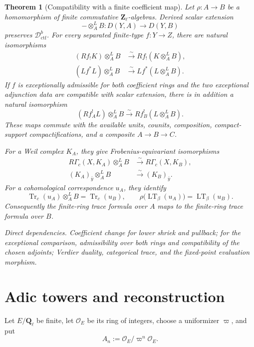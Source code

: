 \documentclass[10pt]{article}
\newtheorem{theorem}{Theorem}[section]
\theoremstyle{definition}
\newcommand{\Zl}{\mathbf Z_\ell}
\newcommand{\Ql}{\mathbf Q_\ell}
\newcommand{\OO}{\mathcal O}
\newcommand{\Dctf}{\mathcal D^b_{\mathrm{ctf}}}
\newcommand{\RGammac}{R\Gamma_c}
\newcommand{\depends}[1]{\par\smallskip\noindent\textit{Direct dependencies.} #1\par}
\begin{document}
\begin{theorem}[Compatibility with a finite coefficient map]
Let \(\rho:A\to B\) be a homomorphism of finite commutative
\(\Zl\)-algebras.  Derived scalar extension
\[
 -\otimes_A^LB:D(Y,A)\to D(Y,B)
\]
preserves \(\Dctf\).  For every separated finite-type \(f:Y\to Z\), there
are natural isomorphisms
\[
\begin{aligned}
(Rf_!K)\otimes_A^LB&\xrightarrow{\sim}Rf_!(K\otimes_A^LB),\\
(Lf^*L)\otimes_A^LB&\xrightarrow{\sim}Lf^*(L\otimes_A^LB).
\end{aligned}
\]
If \(f\) is exceptionally admissible for both coefficient rings and the
two exceptional adjunction data are compatible with scalar extension, there
is in addition a natural isomorphism
\[
 (Rf_A^!L)\otimes_A^LB
 \xrightarrow{\sim}Rf_B^!(L\otimes_A^LB).
\]
These maps commute with the available units, counits, composition,
compact-support compactifications, and a composite \(A\to B\to C\).

For a Weil complex \(K_A\), they give Frobenius-equivariant isomorphisms
\[
\begin{aligned}
\RGammac(X,K_A)\otimes_A^LB&\xrightarrow{\sim}\RGammac(X,K_B),\\
(K_A)_{\bar y}\otimes_A^LB&\xrightarrow{\sim}(K_B)_{\bar y}.
\end{aligned}
\]
For a cohomological correspondence \(u_A\), they identify
\[
 \operatorname{Tr}_c(u_A)\otimes_A^LB
 =\operatorname{Tr}_c(u_B),
\qquad
 \rho\bigl(\operatorname{LT}_\beta(u_A)\bigr)
 =\operatorname{LT}_\beta(u_B).
\]
Consequently the finite-ring trace formula over \(A\) maps to the
finite-ring trace formula over \(B\).
\depends{Coefficient change for lower shriek and pullback; for the
exceptional comparison, admissibility over both rings and compatibility of
the chosen adjoints; Verdier duality, categorical trace, and the fixed-point
evaluation morphism.}
\end{theorem}

\section{Adic towers and reconstruction}

Let \(E/\Ql\) be finite, let \(\OO_E\) be its ring of integers, choose a
uniformizer \(\varpi\), and put
\[
 A_n:=\OO_E/\varpi^n\OO_E.
\]
\end{document}
